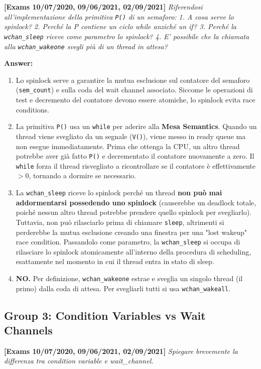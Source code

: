 \textbf{[Exams 10/07/2020, 09/06/2021, 02/09/2021]}
\textit{Riferendosi all'implementazione della primitiva \texttt{P()} di un semaforo:}
\textit{1. A cosa serve lo spinlock? 2. Perché la P contiene un ciclo while anziché un if? 3. Perché la \texttt{wchan\_sleep} riceve come parametro lo spinlock? 4. E’ possibile che la chiamata alla \texttt{wchan\_wakeone} svegli più di un thread in attesa?}

\textbf{Answer:}
\begin{enumerate}
    \item Lo spinlock serve a garantire la mutua esclusione sul contatore del semaforo (\texttt{sem\_count}) e sulla coda del wait channel associato. Siccome le operazioni di test e decremento del contatore devono essere atomiche, lo spinlock evita race conditions.
    \item La primitiva \texttt{P()} usa un \texttt{while} per aderire alla \textbf{Mesa Semantics}. Quando un thread viene svegliato da un segnale (\texttt{V()}), viene messo in ready queue ma non esegue immediatamente. Prima che ottenga la CPU, un altro thread potrebbe aver già fatto \texttt{P()} e decrementato il contatore nuovamente a zero. Il \texttt{while} forza il thread risvegliato a ricontrollare se il contatore è effettivamente $>0$, tornando a dormire se necessario.
    \item La \texttt{wchan\_sleep} riceve lo spinlock perché un thread \textbf{non può mai addormentarsi possedendo uno spinlock} (causerebbe un deadlock totale, poiché nessun altro thread potrebbe prendere quello spinlock per svegliarlo). Tuttavia, non può rilasciarlo prima di chiamare \texttt{sleep}, altrimenti si perderebbe la mutua esclusione creando una finestra per una "lost wakeup" race condition. Passandolo come parametro, la \texttt{wchan\_sleep} si occupa di rilasciare lo spinlock atomicamente all'interno della procedura di scheduling, esattamente nel momento in cui il thread entra in stato di sleep.
    \item \textbf{NO.} Per definizione, \texttt{wchan\_wakeone} estrae e sveglia un singolo thread (il primo) dalla coda di attesa. Per svegliarli tutti si usa \texttt{wchan\_wakeall}.
\end{enumerate}

\newpage
\subsection*{Group 3: Condition Variables vs Wait Channels}

\textbf{[Exams 10/07/2020, 09/06/2021, 02/09/2021]}
\textit{Spiegare brevemente la differenza tra condition variable e wait\_channel.}


